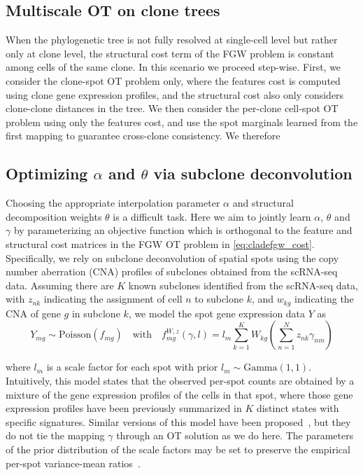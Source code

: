 \documentclass{article}
\begin{document}
\subsection*{Multiscale OT on clone trees}
When the phylogenetic tree is not fully resolved at single-cell level but rather only at clone level, the structural cost term of the FGW problem is constant among cells of the same clone.  In this scenario we proceed step-wise. First, we consider the clone-spot OT problem only, where the features cost is computed using clone gene expression profiles, and the structural cost also only considers clone-clone distances in the tree. We then consider the per-clone cell-spot OT problem using only the features cost, and use the spot marginals learned from the first mapping to guarantee cross-clone consistency. We therefore 


\subsection*{Optimizing $\alpha$ and $\theta$ via subclone deconvolution}
Choosing the appropriate interpolation parameter $\alpha$ and structural decomposition weights $\theta$ is a difficult task. Here we aim to jointly learn $\alpha$, $\theta$ and $\gamma$ by parameterizing an objective function which is orthogonal to the feature and structural cost matrices in the FGW OT problem in \eqref{eq:cladefgw_cost}. Specifically, we rely on subclone deconvolution of spatial spots using the copy number aberration (CNA) profiles of subclones obtained from the scRNA-seq data. Assuming there are $K$ known subclones identified from the scRNA-seq data, with $z_{nk}$ indicating the assignment of cell $n$ to subclone $k$, and $w_{kg}$ indicating the CNA of gene $g$ in subclone $k$, we model the spot gene expression data $Y$ as 
\begin{equation}
\label{eq:obs_model}
    Y_{mg} \sim \mathrm{Poisson}\!\left(f_{mg}\right)\quad \text{with} \quad f^{W,z}_{mg}(\gamma, l) = l_m \sum_{k=1}^K W_{kg} \left(\sum_{n=1}^N z_{nk} \gamma_{nm} \right)
\end{equation}

where $l_m$ is a scale factor for each spot with prior $l_m \sim \mathrm{Gamma}(1, 1)$. Intuitively, this model states that the observed per-spot counts are obtained by a mixture of the gene expression profiles of the cells in that spot, where those gene expression profiles have been previously summarized in $K$ distinct states with specific signatures. Similar versions of this model have been proposed~\cite{lopez2022destvi, kleshchevnikov2022cell2location}, but they do not tie the mapping $\gamma$ through an OT solution as we do here. The parameters of the prior distribution of the scale factors may be set to preserve the empirical per-spot variance-mean ratios~\cite{levitin2019novo}.
    
\end{document}
